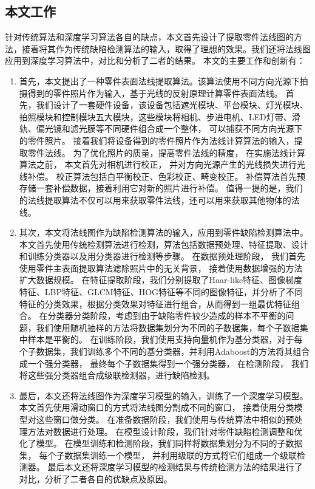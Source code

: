 \subsection{本文工作}

针对传统算法和深度学习算法各自的缺点，本文首先设计了提取零件法线图的方法，接着将其作为传统缺陷检测算法的输入，取得了理想的效果。我们还将法线图应用到深度学习算法中，对比和分析了二者的结果。
本文的主要工作和创新有：
\begin{enumerate}
\item 首先，本文提出了一种零件表面法线提取算法。该算法使用不同方向光源下拍摄得到的零件照片作为输入，基于光线的反射原理计算零件表面法线。
首先，我们设计了一套硬件设备，该设备包括遮光模块、平台模块、灯光模块、拍照模块和控制模块五大模块，这些模块将相机、步进电机、LED灯带、滑轨、偏光镜和滤光膜等不同硬件组合成一个整体，
可以捕获不同方向光源下的零件照片。
接着我们将设备得到的零件照片作为法线计算算法的输入，提取零件法线。
为了优化照片的质量，提高零件法线的精度，
在实施法线计算算法之前，
本文首先对相机进行校正，
并对方向光源产生的光线损失进行光线补偿。
校正算法包括白平衡校正、色彩校正、畸变校正。
补偿算法首先预存储一套补偿数据，接着利用它对新的照片进行补偿。
值得一提的是，我们的法线提取算法不仅可以用来获取零件法线，还可以用来获取其他物体的法线。

\item 其次，本文将法线图作为缺陷检测算法的输入，应用到零件缺陷检测算法中。
本文首先使用传统检测算法进行检测，算法包括数据预处理、特征提取、设计和训练分类器以及用分类器进行检测等步骤。
在数据预处理阶段，
我们首先使用零件主表面提取算法滤除照片中的无关背景，
接着使用数据增强的方法扩大数据规模。
在特征提取阶段，我们分别提取了Haar-like特征、图像梯度特征、LBP特征、GLCM特征、HOG特征等不同的图像特征，并分析了不同特征的分类效果，根据分类效果对特征进行组合，从而得到一组最优特征组合。
在分类器分类阶段，考虑到由于缺陷零件较少造成的样本不平衡的问题，我们使用随机抽样的方法将数据集划分为不同的子数据集，每个子数据集中样本是平衡的。
在训练阶段，我们使用支持向量机作为基分类器，对于每个子数据集，我们训练多个不同的基分类器，并利用Adaboost的方法将其组合成一个强分类器，
最终每个子数据集得到一个强分类器，
在检测阶段，
我们将这些强分类器组合成级联检测器，进行缺陷检测。

\item 最后，本文还将法线图作为深度学习模型的输入，训练了一个深度学习模型。
本文首先使用滑动窗口的方式将法线图分割成不同的窗口，
接着使用分类模型对这些窗口做分类。
在准备数据阶段，我们使用与传统算法中相似的预处理方法对数据进行处理。
在模型设计阶段，我们针对零件缺陷检测调整和优化了模型。
在模型训练和检测阶段，我们同样将数据集划分为不同的子数据集，
每个子数据集训练一个模型，
并利用级联的方式将它们组成一个级联检测器。
最后本文还将深度学习模型的检测结果与传统检测方法的结果进行了对比，分析了二者各自的优缺点及原因。
\end{enumerate}
